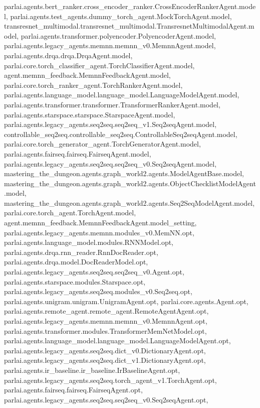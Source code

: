 parlai.\+agents.\+bert\+\_\+ranker.\+cross\+\_\+encoder\+\_\+ranker.\+Cross\+Encoder\+Ranker\+Agent.\+model, parlai.\+agents.\+test\+\_\+agents.\+dummy\+\_\+torch\+\_\+agent.\+Mock\+Torch\+Agent.\+model, transresnet\+\_\+multimodal.\+transresnet\+\_\+multimodal.\+Transresnet\+Multimodal\+Agent.\+model, parlai.\+agents.\+transformer.\+polyencoder.\+Polyencoder\+Agent.\+model, parlai.\+agents.\+legacy\+\_\+agents.\+memnn.\+memnn\+\_\+v0.\+Memnn\+Agent.\+model, parlai.\+agents.\+drqa.\+drqa.\+Drqa\+Agent.\+model, parlai.\+core.\+torch\+\_\+classifier\+\_\+agent.\+Torch\+Classifier\+Agent.\+model, agent.\+memnn\+\_\+feedback.\+Memnn\+Feedback\+Agent.\+model, parlai.\+core.\+torch\+\_\+ranker\+\_\+agent.\+Torch\+Ranker\+Agent.\+model, parlai.\+agents.\+language\+\_\+model.\+language\+\_\+model.\+Language\+Model\+Agent.\+model, parlai.\+agents.\+transformer.\+transformer.\+Transformer\+Ranker\+Agent.\+model, parlai.\+agents.\+starspace.\+starspace.\+Starspace\+Agent.\+model, parlai.\+agents.\+legacy\+\_\+agents.\+seq2seq.\+seq2seq\+\_\+v1.\+Seq2seq\+Agent.\+model, controllable\+\_\+seq2seq.\+controllable\+\_\+seq2seq.\+Controllable\+Seq2seq\+Agent.\+model, parlai.\+core.\+torch\+\_\+generator\+\_\+agent.\+Torch\+Generator\+Agent.\+model, parlai.\+agents.\+fairseq.\+fairseq.\+Fairseq\+Agent.\+model, parlai.\+agents.\+legacy\+\_\+agents.\+seq2seq.\+seq2seq\+\_\+v0.\+Seq2seq\+Agent.\+model, mastering\+\_\+the\+\_\+dungeon.\+agents.\+graph\+\_\+world2.\+agents.\+Model\+Agent\+Base.\+model, mastering\+\_\+the\+\_\+dungeon.\+agents.\+graph\+\_\+world2.\+agents.\+Object\+Checklist\+Model\+Agent.\+model, mastering\+\_\+the\+\_\+dungeon.\+agents.\+graph\+\_\+world2.\+agents.\+Seq2\+Seq\+Model\+Agent.\+model, parlai.\+core.\+torch\+\_\+agent.\+Torch\+Agent.\+model, agent.\+memnn\+\_\+feedback.\+Memnn\+Feedback\+Agent.\+model\+\_\+setting, parlai.\+agents.\+legacy\+\_\+agents.\+memnn.\+modules\+\_\+v0.\+Mem\+N\+N.\+opt, parlai.\+agents.\+language\+\_\+model.\+modules.\+R\+N\+N\+Model.\+opt, parlai.\+agents.\+drqa.\+rnn\+\_\+reader.\+Rnn\+Doc\+Reader.\+opt, parlai.\+agents.\+drqa.\+model.\+Doc\+Reader\+Model.\+opt, parlai.\+agents.\+legacy\+\_\+agents.\+seq2seq.\+seq2seq\+\_\+v0.\+Agent.\+opt, parlai.\+agents.\+starspace.\+modules.\+Starspace.\+opt, parlai.\+agents.\+legacy\+\_\+agents.\+seq2seq.\+modules\+\_\+v0.\+Seq2seq.\+opt, parlai.\+agents.\+unigram.\+unigram.\+Unigram\+Agent.\+opt, parlai.\+core.\+agents.\+Agent.\+opt, parlai.\+agents.\+remote\+\_\+agent.\+remote\+\_\+agent.\+Remote\+Agent\+Agent.\+opt, parlai.\+agents.\+legacy\+\_\+agents.\+memnn.\+memnn\+\_\+v0.\+Memnn\+Agent.\+opt, parlai.\+agents.\+transformer.\+modules.\+Transformer\+Mem\+Net\+Model.\+opt, parlai.\+agents.\+language\+\_\+model.\+language\+\_\+model.\+Language\+Model\+Agent.\+opt, parlai.\+agents.\+legacy\+\_\+agents.\+seq2seq.\+dict\+\_\+v0.\+Dictionary\+Agent.\+opt, parlai.\+agents.\+legacy\+\_\+agents.\+seq2seq.\+dict\+\_\+v1.\+Dictionary\+Agent.\+opt, parlai.\+agents.\+ir\+\_\+baseline.\+ir\+\_\+baseline.\+Ir\+Baseline\+Agent.\+opt, parlai.\+agents.\+legacy\+\_\+agents.\+seq2seq.\+torch\+\_\+agent\+\_\+v1.\+Torch\+Agent.\+opt, parlai.\+agents.\+fairseq.\+fairseq.\+Fairseq\+Agent.\+opt, parlai.\+agents.\+legacy\+\_\+agents.\+seq2seq.\+seq2seq\+\_\+v0.\+Seq2seq\+Agent.\+opt, 